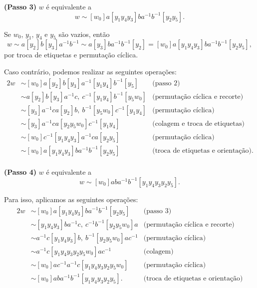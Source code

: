 \begin{lemma}
\begin{dem}
        \noindent \textbf{(Passo 3)} $w$ é equivalente a
        \[w\sim [w_0] a [y_1 y_4 y_3] b a^{-1} b^{-1} [y_2 y_5].\]

        Se $w_0$, $y_1$, $y_4$ e $y_5$ são vazios, então \[w \sim a [y_2] b [y_3] a^{-1} b^{-1} \sim a [y_3] b a^{-1} b^{-1} [y_2] = [w_0] a [y_1 y_4 y_3] b a^{-1} b^{-1} [y_2 y_5],\] por troca de etiquetas e permutação cíclica.

        Caso contrário, podemos realizar as seguintes operações:
        \begin{alignat*}{2}
            w &\sim [w_0] a [y_2] b [y_3] a^{-1} [y_1 y_4] b^{-1} [y_5] &\text{(passo 2)}\\
            &\sim a [y_2] b [y_3] a^{-1} c,\ c^{-1} [y_1 y_4] b^{-1} [y_5 w_0] &\text{(permutação cíclica e recorte)}\\
            &\sim [y_3] a^{-1} c a [y_2] b,\ b^{-1} [y_5 w_0] c^{-1} [y_1 y_4] &\text{(permutação cíclica)}\\
            &\sim [y_3] a^{-1} c a [y_2 y_5 w_0] c^{-1} [y_1 y_4] &\text{(colagem e troca de etiquetas)}\\
            &\sim [w_0] c^{-1} [y_1 y_4 y_3] a^{-1} c a [y_2 y_5] &\text{(permutação cíclica)}\\
            &\sim [w_0] a [y_1 y_4 y_3] b a^{-1} b^{-1} [y_2 y_5] &\text{(troca de etiquetas e orientação)}.
        \end{alignat*}\\

        \noindent \textbf{(Passo 4)} $w$ é equivalente a
        \[w \sim [w_0] aba^{-1}b^{-1} [y_1 y_4 y_3 y_2 y_5].\]

        Para isso, aplicamos as seguintes operações:
        \begin{alignat*}{2}
            w&\sim [w_0] a [y_1 y_4 y_3] b a^{-1} b^{-1} [y_2 y_5] &\text{(passo 3)}\\
            &\sim [y_1 y_4 y_3] b a^{-1} c,\ c^{-1} b^{-1} [y_2 y_5 w_0] a &\text{(permutação cíclica e recorte)}\\
            &\sim a^{-1} c [y_1 y_4 y_3] b,\ b^{-1} [y_2 y_5 w_0] a c^{-1} &\text{(permutação cíclica)}\\
            &\sim a^{-1} c [y_1 y_4 y_3 y_2 y_5 w_0] a c^{-1} &\text{(colagem)}\\
            &\sim [w_0] a c^{-1} a^{-1} c [y_1 y_4 y_3 y_2 y_5 w_0] &\text{(permutação cíclica)}\\
            &\sim [w_0] a b a^{-1} b^{-1} [y_1 y_4 y_3 y_2 y_5]. &\text{(troca de etiquetas e orientação)}
        \end{alignat*}
    \end{dem}
\end{lemma}

